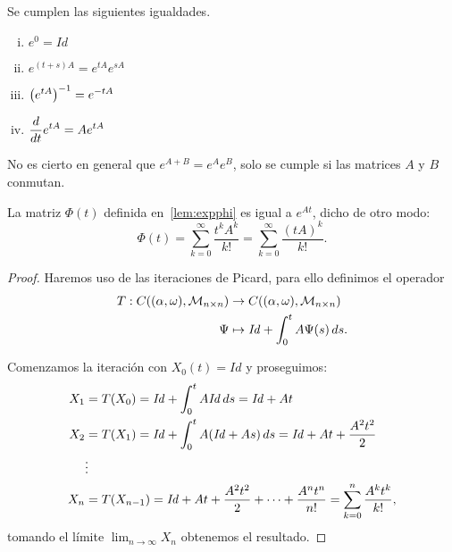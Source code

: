 \documentclass[../ecuaciones_diferenciales.tex]{subfiles}
\begin{document}
\begin{proposition}
	Se cumplen las siguientes igualdades.
	\begin{multicols}{2}
		\begin{enumerate}[i)]
			\item \(\displaystyle e^0 = \mathit{Id}\)

			\item \(\displaystyle e^{(t + s)A} = e^{tA} e^{sA}\)

			\item \(\displaystyle \parens{e^{tA}}^{-1} = e^{-tA}\)

			\item \(\displaystyle \frac{d}{\mathop{d\!} t} e^{tA} = A e^{tA}\)
		\end{enumerate}
	\end{multicols}
\end{proposition}

\begin{remark}
	No es cierto en general que \(e^{A + B} = e^A e^B\), solo se cumple si las
	matrices \(A\) y \(B\) conmutan.
\end{remark}

\begin{theorem}
	La matriz \(\Phi(t)\) definida en~\ref{lem:expphi} es igual a \(e^{At}\),
	dicho de otro modo:
	\[\Phi(t) = \sum_{k = 0}^\infty \frac{t^k A^k}{k!} =
		\sum_{k = 0}^\infty \frac{(tA)^k}{k!}.\]
\end{theorem}

\begin{proof}
	Haremos uso de las iteraciones de Picard, para ello definimos el operador
	\begin{align*}
		T : C((\alpha, \omega), \mathcal{M}_{n \times n}) 
		& \to C((\alpha, \omega), \mathcal{M}_{n \times n}) \\
		\Psi & \mapsto \mathit{Id} + \int_0^t A \Psi(s) \mathop{d\!} s.
	\end{align*}

	Comenzamos la iteración con \(X_0(t) = \mathit{Id}\) y proseguimos:
	\begin{align*}
		X_1 & = T(X_0) = \mathit{Id} + \int_0^t A \mathit{Id} \mathop{d\!} s =
		\mathit{Id} + At                                                      \\
		X_2 & = T(X_1) = \mathit{Id} + \int_0^t A (\mathit{Id} + As) \mathop{d\!} s =
		\mathit{Id} + At + \frac{A^2 t^2}{2}                                  \\
		    & \vdots                                                          \\
		X_n & = T(X_{n - 1}) =
		\mathit{Id} + At + \frac{A^2 t^2}{2} + \cdots + \frac{A^n t^n}{n!}
		= \sum_{k = 0}^n \frac{A^k t^k}{k!},
	\end{align*}
	tomando el límite \(\lim_{n \to \infty} X_n\) obtenemos el resultado.
\end{proof}
\end{document}
